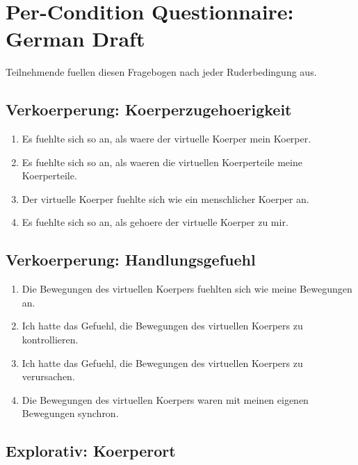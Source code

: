 \section{Per-Condition Questionnaire: German Draft}
\label{app:questionnaires_per_condition_german}

Teilnehmende fuellen diesen Fragebogen nach jeder Ruderbedingung aus.


\subsection*{Verkoerperung: Koerperzugehoerigkeit}

\begin{enumerate}
    \item Es fuehlte sich so an, als waere der virtuelle Koerper mein Koerper.
    \item Es fuehlte sich so an, als waeren die virtuellen Koerperteile meine Koerperteile.
    \item Der virtuelle Koerper fuehlte sich wie ein menschlicher Koerper an.
    \item Es fuehlte sich so an, als gehoere der virtuelle Koerper zu mir.
\end{enumerate}

\subsection*{Verkoerperung: Handlungsgefuehl}

\begin{enumerate}
    \item Die Bewegungen des virtuellen Koerpers fuehlten sich wie meine Bewegungen an.
    \item Ich hatte das Gefuehl, die Bewegungen des virtuellen Koerpers zu kontrollieren.
    \item Ich hatte das Gefuehl, die Bewegungen des virtuellen Koerpers zu verursachen.
    \item Die Bewegungen des virtuellen Koerpers waren mit meinen eigenen Bewegungen synchron.
\end{enumerate}

\subsection*{Explorativ: Koerperort}

